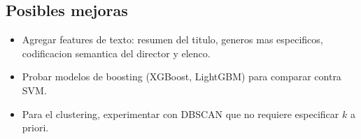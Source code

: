 \documentclass[12pt, a4paper]{article}
\begin{document}
\subsection{Posibles mejoras}

\begin{itemize}
\item Agregar features de texto: resumen del titulo, generos mas especificos, codificacion semantica del director y elenco.
\item Probar modelos de boosting (XGBoost, LightGBM) para comparar contra SVM.
\item Para el clustering, experimentar con DBSCAN que no requiere especificar $k$ a priori.
\end{itemize}
\end{document}
